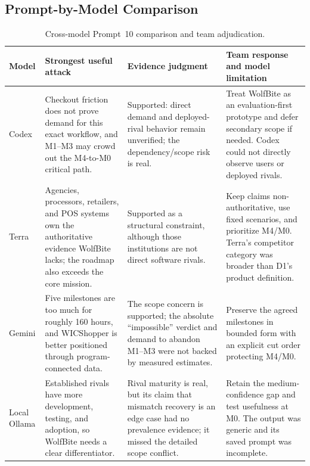 \documentclass[sigconf]{acmart}
\begin{document}
\subsection{Prompt-by-Model Comparison}

\begin{table}[t]
  \caption{Cross-model Prompt~10 comparison and team adjudication.}
  \label{tab:model-comparison}
  \centering
  \footnotesize
  \begin{tabular}{L{2.1cm}L{4.1cm}L{4.4cm}L{4.5cm}}
    \toprule
    Model & Strongest useful attack & Evidence judgment & Team response and model limitation \\
    \midrule
    Codex &
    Checkout friction does not prove demand for this exact workflow, and
    M1--M3 may crowd out the M4-to-M0 critical path. &
    Supported: direct demand and deployed-rival behavior remain unverified;
    the dependency/scope risk is real. &
    Treat WolfBite as an evaluation-first prototype and defer secondary scope
    if needed. Codex could not directly observe users or deployed rivals. \\
    \addlinespace
    Terra &
    Agencies, processors, retailers, and POS systems own the authoritative
    evidence WolfBite lacks; the roadmap also exceeds the core mission. &
    Supported as a structural constraint, although those institutions are not
    direct software rivals. &
    Keep claims non-authoritative, use fixed scenarios, and prioritize M4/M0.
    Terra's competitor category was broader than D1's product definition. \\
    \addlinespace
    Gemini &
    Five milestones are too much for roughly 160 hours, and WICShopper is
    better positioned through program-connected data. &
    The scope concern is supported; the absolute ``impossible'' verdict and
    demand to abandon M1--M3 were not backed by measured estimates. &
    Preserve the agreed milestones in bounded form with an explicit cut order
    protecting M4/M0. \\
    \addlinespace
    Local Ollama &
    Established rivals have more development, testing, and adoption, so
    WolfBite needs a clear differentiator. &
    Rival maturity is real, but its claim that mismatch recovery is an edge
    case had no prevalence evidence; it missed the detailed scope conflict. &
    Retain the medium-confidence gap and test usefulness at M0. The output was
    generic and its saved prompt was incomplete. \\
    \bottomrule
  \end{tabular}
\end{table}
\end{document}
